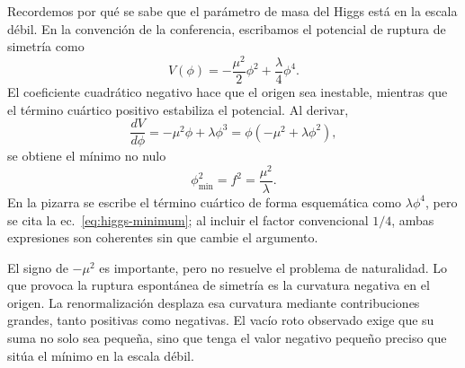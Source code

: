 \begin{classroomqa}
\end{classroomqa}

\begin{classroomqa}
\end{classroomqa}

Recordemos por qué se sabe que el parámetro de masa del Higgs está en la escala débil. En la convención de la conferencia, escribamos el potencial de ruptura de simetría como
\begin{equation}
V(\phi)=-\frac{\mu^2}{2}\phi^2+\frac{\lambda}{4}\phi^4.
\label{eq:higgs-potential}
\end{equation}
El coeficiente cuadrático negativo hace que el origen sea inestable, mientras que el término cuártico positivo estabiliza el potencial. Al derivar,
\begin{equation}
\frac{dV}{d\phi}=-\mu^2\phi+\lambda\phi^3
=\phi(-\mu^2+\lambda\phi^2),
\end{equation}
se obtiene el mínimo no nulo
\begin{equation}
\phi_{\min}^2=f^2=\frac{\mu^2}{\lambda}.
\label{eq:higgs-minimum}
\end{equation}
En la pizarra se escribe el término cuártico de forma esquemática como \(\lambda\phi^4\), pero se cita la ec.~\eqref{eq:higgs-minimum}; al incluir el factor convencional \(1/4\), ambas expresiones son coherentes sin que cambie el argumento.

El signo de \(-\mu^2\) es importante, pero no resuelve el problema de naturalidad. Lo que provoca la ruptura espontánea de simetría es la curvatura negativa en el origen. La renormalización desplaza esa curvatura mediante contribuciones grandes, tanto positivas como negativas. El vacío roto observado exige que su suma no solo sea pequeña, sino que tenga el valor negativo pequeño preciso que sitúa el mínimo en la escala débil.

